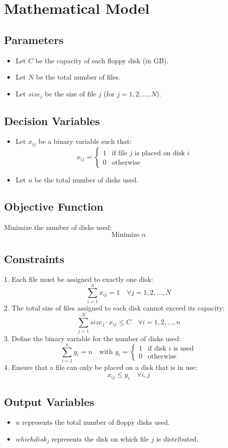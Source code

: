\documentclass{article}
\begin{document}
\section*{Mathematical Model}

\subsection*{Parameters}
\begin{itemize}
    \item Let \( C \) be the capacity of each floppy disk (in GB).
    \item Let \( N \) be the total number of files.
    \item Let \( size_j \) be the size of file \( j \) (for \( j = 1, 2, \ldots, N \)).
\end{itemize}

\subsection*{Decision Variables}
\begin{itemize}
    \item Let \( x_{ij} \) be a binary variable such that:
    \[
    x_{ij} =
    \begin{cases}
    1 & \text{if file } j \text{ is placed on disk } i \\
    0 & \text{otherwise}
    \end{cases}
    \]
    \item Let \( n \) be the total number of disks used.
\end{itemize}

\subsection*{Objective Function}
Minimize the number of disks used:
\[
\text{Minimize } n
\]

\subsection*{Constraints}
1. Each file must be assigned to exactly one disk:
\[
\sum_{i=1}^{n} x_{ij} = 1 \quad \forall j = 1, 2, \ldots, N
\]
2. The total size of files assigned to each disk cannot exceed its capacity:
\[
\sum_{j=1}^{N} size_j \cdot x_{ij} \leq C \quad \forall i = 1, 2, \ldots, n
\]
3. Define the binary variable for the number of disks used:
\[
\sum_{i=1}^{n} y_i = n \quad \text{with } y_i = 
\begin{cases}
1 & \text{if disk } i \text{ is used} \\
0 & \text{otherwise}
\end{cases}
\]
4. Ensure that a file can only be placed on a disk that is in use:
\[
x_{ij} \leq y_i \quad \forall i, j
\]

\subsection*{Output Variables}
\begin{itemize}
    \item \( n \) represents the total number of floppy disks used.
    \item \( whichdisk_j \) represents the disk on which file \( j \) is distributed.
\end{itemize}
\end{document}
